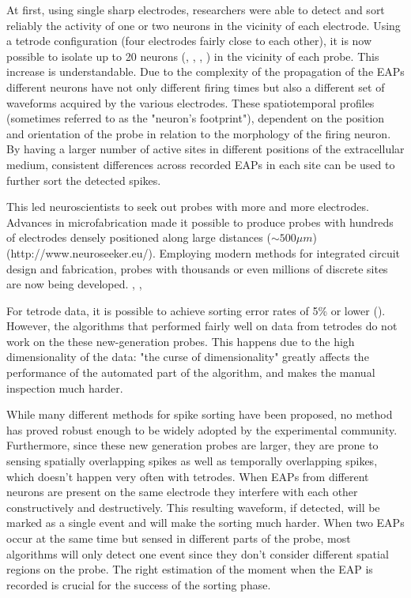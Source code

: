 At first, using single sharp electrodes, researchers were able to detect and sort reliably the activity of one or two neurons in the vicinity of each electrode. Using a tetrode configuration (four electrodes fairly close to each other), it is now possible to isolate up to 20 neurons (\cite{mcnaughton1983stereotrode}, \cite{gray1995tetrodes}, \cite{wilson1993dynamics}, \cite{recce1989tetrode}) in the vicinity of each probe. This increase is understandable. Due to the complexity of the propagation of the EAPs different neurons have not only different firing times but also a different set of waveforms acquired by the various electrodes. These spatiotemporal profiles (sometimes referred to as the "neuron's footprint"), dependent on the position and orientation of the probe in relation to the morphology of the firing neuron. By having a larger number of active sites in different positions of the extracellular medium, consistent differences across recorded EAPs in each site can be used to further sort the detected spikes. 

This led neuroscientists to seek out probes with more and more electrodes. Advances in microfabrication made it possible to produce probes with hundreds of electrodes densely positioned along large distances ($\sim 500 \mu m$) (http://www.neuroseeker.eu/). Employing modern methods for integrated circuit design and fabrication, probes with thousands or even millions of discrete sites are now being developed. \cite{dombovari2014vivo}, \cite{ruther2015new}, \cite{shobe2015brain}

For tetrode data, it is possible to achieve sorting error rates of 5\% or lower (\cite{harris2000accuracy}). However, the algorithms that performed fairly well on data from tetrodes do not work on the these new-generation probes. This happens due to the high dimensionality of the data: "the curse of dimensionality" greatly affects the performance of the automated part of the algorithm, and makes the manual inspection much harder.

While many different methods for spike sorting have been proposed, no method has proved robust enough to be widely adopted by the experimental community. Furthermore, since these new generation probes are larger, they are prone to sensing spatially overlapping spikes as well as temporally overlapping spikes, which doesn't happen very often with tetrodes. When EAPs from different neurons are present on the same electrode they interfere with each other constructively and destructively. This resulting waveform, if detected, will be marked as a single event and will make the sorting much harder. When two EAPs occur at the same time but sensed in different parts of the probe, most algorithms will only detect one event since they don't consider different spatial regions on the probe. The right estimation of the moment when the EAP is recorded is crucial for the success of the sorting phase. 

